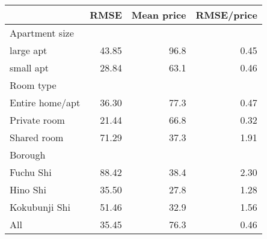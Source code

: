 
\begin{tabular}{lrrr}
\toprule
 & RMSE & Mean price & RMSE/price\\
\midrule
Apartment size &  &  & \\
large apt & 43.85 & 96.8 & 0.45\\
small apt & 28.84 & 63.1 & 0.46\\
Room type &  &  & \\
Entire home/apt & 36.30 & 77.3 & 0.47\\
Private room & 21.44 & 66.8 & 0.32\\
Shared room & 71.29 & 37.3 & 1.91\\
Borough &  &  & \\
Fuchu Shi & 88.42 & 38.4 & 2.30\\
Hino Shi & 35.50 & 27.8 & 1.28\\
Kokubunji Shi & 51.46 & 32.9 & 1.56\\
All & 35.45 & 76.3 & 0.46\\
\bottomrule
\end{tabular}